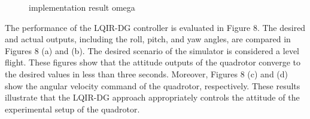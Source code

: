 \documentclass[conference]{IEEEtran}
\begin{document}
\begin{figure}[!t]
	\centering
	\hfil
	\caption{implementation result omega}
\end{figure}

The performance of the LQIR-DG controller is evaluated in Figure 8. The desired and actual outputs, including the roll, pitch, and yaw angles, are compared in Figures 8 (a) and (b). The desired scenario of the simulator is considered a level flight. These figures show that the attitude outputs of the quadrotor converge to the desired values in less than three seconds. Moreover, Figures 8 (c) and (d) show the angular velocity command of the quadrotor, respectively. These results illustrate that the LQIR-DG approach appropriately controls the attitude of the experimental setup of the quadrotor.
\end{document}

